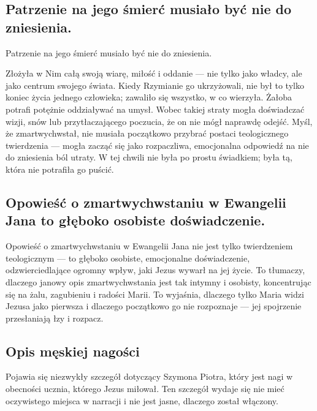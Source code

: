 \subsection{Patrzenie na jego śmierć musiało być nie do zniesienia.}\label{subsec:watching-him-die-would-have-been-unbearable.}

Patrzenie na jego śmierć musiało być nie do zniesienia.

Złożyła w Nim całą swoją wiarę, miłość i oddanie --- nie tylko jako władcy, ale jako centrum swojego świata.
Kiedy Rzymianie go ukrzyżowali, nie był to tylko koniec życia jednego człowieka; zawaliło się wszystko, w co wierzyła.
Żałoba potrafi potężnie oddziaływać na umysł.
Wobec takiej straty mogła doświadczać wizji, snów lub przytłaczającego poczucia, że on nie mógł naprawdę odejść.
Myśl, że zmartwychwstał, nie musiała początkowo przybrać postaci teologicznego twierdzenia --- mogła zacząć się jako rozpaczliwa, emocjonalna odpowiedź na nie do zniesienia ból utraty.
W tej chwili nie była po prostu świadkiem; była tą, która nie potrafiła go puścić.

\subsection{Opowieść o zmartwychwstaniu w Ewangelii Jana to głęboko osobiste doświadczenie.}\label{subsec:the-resurrection-story-in-john-isnt-just-a-theological-claimits-a-deeply-personal-emotional-experience-that-reflects-the-profound-impact-jesus-had-on-her-life.}

Opowieść o zmartwychwstaniu w Ewangelii Jana nie jest tylko twierdzeniem teologicznym --- to głęboko osobiste, emocjonalne doświadczenie, odzwierciedlające ogromny wpływ, jaki Jezus wywarł na jej życie.
To tłumaczy, dlaczego janowy opis zmartwychwstania jest tak intymny i osobisty, koncentrując się na żalu, zagubieniu i radości Marii.
To wyjaśnia, dlaczego tylko Maria widzi Jezusa jako pierwsza i dlaczego początkowo go nie rozpoznaje --- jej spojrzenie przesłaniają łzy i rozpacz.

\subsection{Opis męskiej nagości}\label{subsec:description-of-male-nudity}

Pojawia się niezwykły szczegół dotyczący Szymona Piotra, który jest nagi w obecności ucznia, którego Jezus miłował.
Ten szczegół wydaje się nie mieć oczywistego miejsca w narracji i nie jest jasne, dlaczego został włączony.

